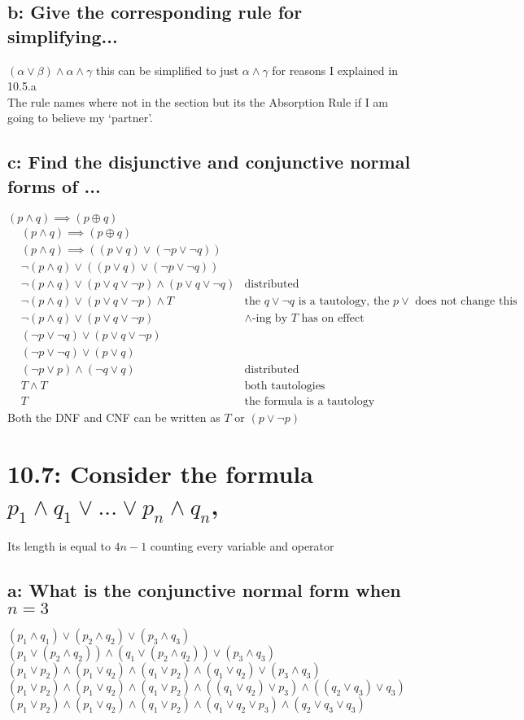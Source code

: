 \documentclass{article}
\begin{document}
\subsection*{b: Give the corresponding rule for simplifying...}
$(\alpha \lor \beta) \land \alpha \land \gamma$
this can be simplified to just $\alpha \land \gamma$ for reasons I explained in 10.5.a \\
The rule names where not in the section but its the Absorption Rule if I am going to believe my `partner'.
\subsection*{c: Find the disjunctive and conjunctive normal forms of ...}
$(p \land q) \implies (p \oplus q)$ \\
\begin{align*}
  &(p \land q) \implies (p \oplus q) \\
  &(p \land q) \implies ((p \lor q) \lor (\neg p \lor \neg q)) \\
  &\neg(p \land q) \lor ((p \lor q) \lor (\neg p \lor \neg q)) \\
  &\neg(p \land q) \lor (p \lor q \lor \neg p) \land (p \lor q \lor \neg q) & \text{distributed} \\
  &\neg(p \land q) \lor (p \lor q \lor \neg p) \land T & \text{the $q \lor \neg q$ is a tautology, the $p \lor$ does not change this} \\
  &\neg(p \land q) \lor (p \lor q \lor \neg p) & \text{$\land$-ing by $T$ has on effect} \\
  &(\neg p \lor \neg q) \lor (p \lor q \lor \neg p) \\
  &(\neg p \lor \neg q) \lor (p \lor q) \\
  &(\neg p \lor p) \land (\neg q \lor q) & \text{distributed} \\
  &T \land T &\text{both tautologies} \\
  &T &\text{the formula is a tautology}
\end{align*}
Both the DNF and CNF can be written as $T$ or $(p \lor \neg p)$
\section*{10.7: Consider the formula $p_1 \land q_1 \lor ... \lor p_n \land q_n$,}
Its length is equal to $4n - 1$ counting every variable and operator
\subsection*{a: What is the conjunctive normal form when $n = 3$}
$(p_1 \land q_1) \lor (p_2 \land q_2) \lor (p_3 \land q_3)$ \\
$(p_1 \lor (p_2 \land q_2)) \land (q_1 \lor (p_2 \land q_2)) \lor (p_3 \land q_3)$
$(p_1 \lor p_2) \land (p_1 \lor q_2) \land (q_1 \lor p_2) \land (q_1 \lor q_2) \lor (p_3 \land q_3)$ \\
$(p_1 \lor p_2) \land (p_1 \lor q_2) \land (q_1 \lor p_2) \land ((q_1 \lor q_2) \lor p_3) \land ((q_2 \lor q_3) \lor q_3)$ \\
$(p_1 \lor p_2) \land (p_1 \lor q_2) \land (q_1 \lor p_2) \land (q_1 \lor q_2 \lor p_3) \land (q_2 \lor q_3 \lor q_3)$ 
\end{document}
